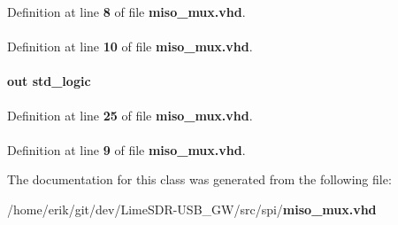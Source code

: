 Definition at line {\bf 8} of file {\bf miso\+\_\+mux.\+vhd}.

\paragraph[{numeric\+\_\+std}]{\hspace{0.3cm}{\ttfamily [Package]}}\label{classmiso__mux_a2edc34402b573437d5f25fa90ba4013e}


Definition at line {\bf 10} of file {\bf miso\+\_\+mux.\+vhd}.

\paragraph[{out\+\_\+miso}]{ {\bfseries \textcolor{keywordflow}{out}\textcolor{vhdlchar}{ }} {\bfseries \textcolor{comment}{std\+\_\+logic}\textcolor{vhdlchar}{ }} \hspace{0.3cm}{\ttfamily [Port]}}\label{classmiso__mux_a2e8c767cbba651b50d6d02428d4ec67e}


Definition at line {\bf 25} of file {\bf miso\+\_\+mux.\+vhd}.

\paragraph[{std\+\_\+logic\+\_\+1164}]{\hspace{0.3cm}{\ttfamily [Package]}}\label{classmiso__mux_acd03516902501cd1c7296a98e22c6fcb}


Definition at line {\bf 9} of file {\bf miso\+\_\+mux.\+vhd}.



The documentation for this class was generated from the following file\+:\begin{DoxyCompactItemize}
\item 
/home/erik/git/dev/\+Lime\+S\+D\+R-\/\+U\+S\+B\+\_\+\+G\+W/src/spi/{\bf miso\+\_\+mux.\+vhd}\end{DoxyCompactItemize}
